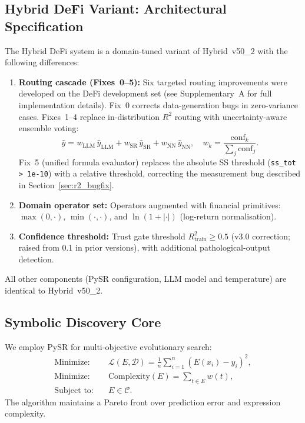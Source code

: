 \documentclass[twoside,11pt]{article}
\begin{document}
\subsection{Hybrid DeFi Variant: Architectural Specification}\label{subsec:hybrid-defi-variant-architectural-specif}
\label{sec:hybrid_defi_spec}

The Hybrid DeFi system is a domain-tuned variant of Hybrid~v50\_2 with the
following differences:

\begin{enumerate}
\item \textbf{Routing cascade (Fixes~0--5):} Six targeted routing improvements
  were developed on the DeFi development set (see Supplementary~A for full
  implementation details).  Fix~0 corrects data-generation bugs in zero-variance
  cases.  Fixes~1--4 replace in-distribution $R^2$ routing with uncertainty-aware
  ensemble voting:
  \[
    \hat{y} = w_\mathrm{LLM}\,\hat{y}_\mathrm{LLM}
             + w_\mathrm{SR}\,\hat{y}_\mathrm{SR}
             + w_\mathrm{NN}\,\hat{y}_\mathrm{NN},
    \quad w_k = \frac{\mathrm{conf}_k}{\sum_j \mathrm{conf}_j}.
  \]
  Fix~5 (unified formula evaluator) replaces the absolute SS threshold
  (\texttt{ss\_tot > 1e-10}) with a relative threshold, correcting the
  measurement bug described in Section~\ref{sec:r2_bugfix}.
\item \textbf{Domain operator set:} Operators augmented with financial
  primitives: $\max(0,\cdot)$, $\min(\cdot,\cdot)$, and
  $\ln(1+|\cdot|)$ (log-return normalisation).
\item \textbf{Confidence threshold:} Trust gate threshold $R^2_{\mathrm{train}} \geq 0.5$
  (v3.0 correction; raised from 0.1 in prior versions), with additional
  pathological-output detection.
\end{enumerate}

All other components (PySR configuration, LLM model and
temperature) are identical to Hybrid~v50\_2.

\subsection{Symbolic Discovery Core}\label{subsec:symbolic-discovery-core}
\label{sec:arch_discovery}

We employ PySR \citep{cranmer2023pysr} for multi-objective evolutionary search:
\begin{align}
\text{Minimize:} \quad
& \mathcal{L}(E,\mathcal{D})
  = \frac{1}{n}\sum_{i=1}^n (E(x_i) - y_i)^2, \label{eq:loss}\\
\text{Minimize:} \quad
& \mathrm{Complexity}(E) = \sum_{t \in E} w(t), \label{eq:complexity}\\
\text{Subject to:} \quad
& E \in \mathcal{C}. \label{eq:constraints}
\end{align}
The algorithm maintains a Pareto front over prediction error and expression
complexity.
\end{document}
